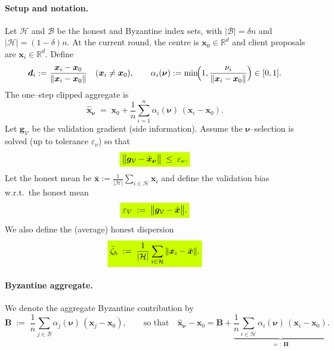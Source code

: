\documentclass{article}
\theoremstyle{plain}
\theoremstyle{definition}
\theoremstyle{remark}
\begin{document}
\paragraph{Setup and notation.}
Let $\mathcal{H}$ and $\mathcal{B}$ be the honest and Byzantine index sets, with
$|\mathcal{B}|=\delta n$ and $|\mathcal{H}|=(1-\delta)n$.
At the current round, the centre is $\bm{x}_0\in\mathbb{R}^d$ and client proposals are
$\bm{x}_i\in\mathbb{R}^d$.
Define
\[
\bm{d}_i := \frac{\bm{x}_i-\bm{x}_0}{\|\bm{x}_i-\bm{x}_0\|}\quad(\bm{x}_i\neq \bm{x}_0),
\qquad
\alpha_i(\bm{\nu}) := \min\!\Bigl(1,\frac{\nu_i}{\|\bm{x}_i-\bm{x}_0\|}\Bigr)\in[0,1].
\]
The one–step clipped aggregate is
\[
\hat{\bm{x}}_{\bm{\nu}}
\;=\;
\bm{x}_0 + \frac{1}{n}\sum_{i=1}^n \alpha_i(\bm{\nu})\,(\bm{x}_i-\bm{x}_0).
\]
Let $\bm{g}_{\mathcal{V}}$ be the validation gradient (side information).
Assume the $\bm{\nu}$–selection is solved (up to tolerance $\varepsilon_\nu$) so that
\begin{equation}
  \colorbox{fluor}{%
    $\displaystyle
        \bigl\|\bm{g}_{\mathcal{V}} - \hat{\bm{x}}_{\bm{\nu}}\bigr\| \;\le\; \varepsilon_\nu.	
    $%
  }
\label{eq:fit-tol}
\end{equation}
Let the honest mean be $\bar{\bm{x}} := \frac{1}{|\mathcal{H}|}\sum_{i\in\mathcal{H}}\bm{x}_i$
and define the validation bias w.r.t.\ the honest mean
\begin{equation}
  \colorbox{fluor}{%
    $\displaystyle
        \varepsilon_V \;:=\; \bigl\|\bm{g}_{\mathcal{V}}-\bar{\bm{x}}\bigr\|.	
    $%
  }
\label{eq:val-bias}
\end{equation}
We also define the (average) honest dispersion
\begin{equation}
  \colorbox{fluor}{%
    $\displaystyle
        \bar{\zeta}_h \;:=\; \frac{1}{|\mathcal{H}|}\sum_{i\in\mathcal{H}} \|\bm{x}_i-\bar{\bm{x}}\|.	
    $%
  }
\label{eq:avg-dispersion}
\end{equation}

\paragraph{Byzantine aggregate.}
We denote the aggregate Byzantine contribution by
\begin{equation}
\bm{B}
\;:=\;
\frac{1}{n}\sum_{j\in\mathcal{B}} \alpha_j(\bm{\nu})\,(\bm{x}_j-\bm{x}_0),
\qquad
\text{so that}\quad
\hat{\bm{x}}_{\bm{\nu}} - \bm{x}_0
= \bm{B} + \underbrace{\frac{1}{n}\sum_{i\in\mathcal{H}} \alpha_i(\bm{\nu})\,(\bm{x}_i-\bm{x}_0)}_{=:~\bm{H}}.
\label{eq:B-and-H}
\end{equation}
\end{document}
